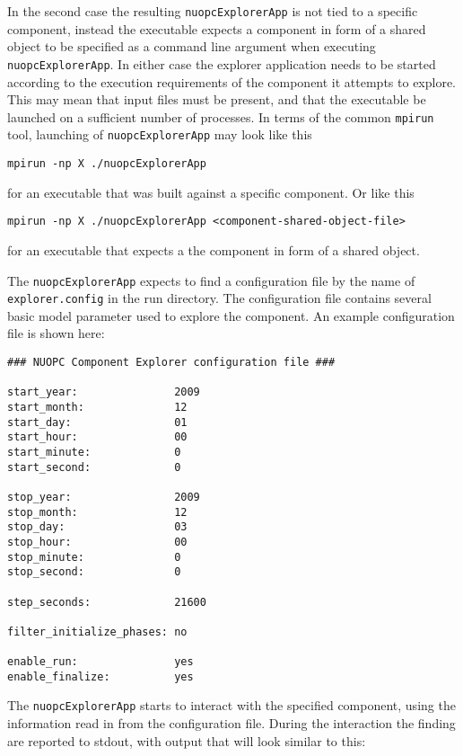 In the second case the resulting {\tt nuopcExplorerApp} is not tied to a specific component, instead the executable expects a component in form of a shared object to be specified as a command line argument when executing {\tt nuopcExplorerApp}. In either case the explorer application needs to be started according to the execution requirements of the component it attempts to explore. This may mean that input files must be present, and that the executable be launched on a sufficient number of processes. In terms of the common {\tt mpirun} tool, launching of {\tt nuopcExplorerApp} may look like this
\begin{verbatim}
mpirun -np X ./nuopcExplorerApp
\end{verbatim}
for an executable that was built against a specific component. Or like this
\begin{verbatim}
mpirun -np X ./nuopcExplorerApp <component-shared-object-file>
\end{verbatim}
for an executable that expects a the component in form of a shared object. 

The {\tt nuopcExplorerApp} expects to find a configuration file by the name of {\tt explorer.config} in the run directory. The configuration file contains several basic model parameter used to explore the component. An example configuration file is shown here:

\begin{verbatim}
### NUOPC Component Explorer configuration file ###

start_year:               2009
start_month:              12
start_day:                01
start_hour:               00
start_minute:             0
start_second:             0

stop_year:                2009
stop_month:               12
stop_day:                 03
stop_hour:                00
stop_minute:              0
stop_second:              0

step_seconds:             21600

filter_initialize_phases: no

enable_run:               yes
enable_finalize:          yes
\end{verbatim}

The {\tt nuopcExplorerApp} starts to interact with the specified component, using the information read in from the configuration file. During the interaction the finding are reported to stdout, with output that will look similar to this:

